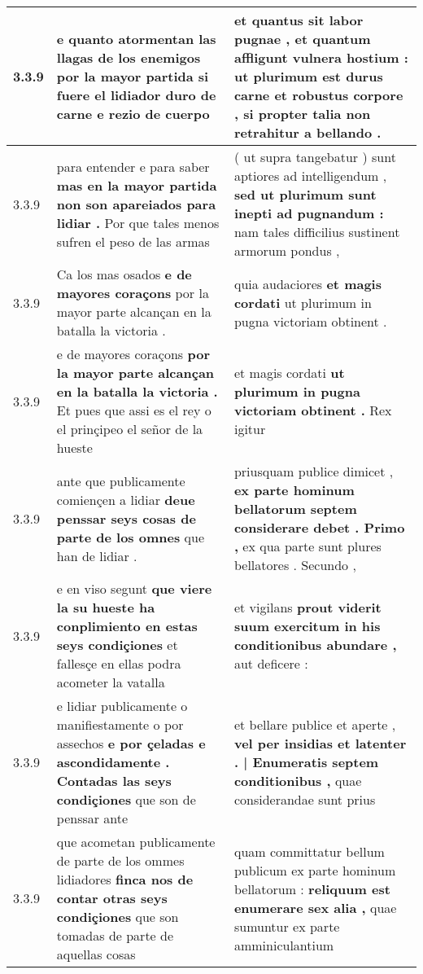\begin{tabular}{|p{1cm}|p{6.5cm}|p{6.5cm}|}
3.3.9 & e quanto atormentan las llagas de los enemigos \textbf{ por la mayor partida } si fuere el lidiador duro de carne e rezio de cuerpo & et quantus sit labor pugnae , et quantum affligunt vulnera hostium : \textbf{ ut plurimum est durus carne et robustus corpore , } si propter talia non retrahitur a bellando . \\\hline
3.3.9 & para entender e para saber \textbf{ mas en la mayor partida non son apareiados para lidiar . } Por que tales menos sufren el peso de las armas & ( ut supra tangebatur ) sunt aptiores ad intelligendum , \textbf{ sed ut plurimum sunt inepti ad pugnandum : } nam tales difficilius sustinent armorum pondus , \\\hline
3.3.9 & Ca los mas osados \textbf{ e de mayores coraçons } por la mayor parte alcançan en la batalla la victoria . & quia audaciores \textbf{ et magis cordati } ut plurimum in pugna victoriam obtinent . \\\hline
3.3.9 & e de mayores coraçons \textbf{ por la mayor parte alcançan en la batalla la victoria . } Et pues que assi es el rey o el prinçipeo el señor de la hueste & et magis cordati \textbf{ ut plurimum in pugna victoriam obtinent . } Rex igitur \\\hline
3.3.9 & ante que publicamente comiençen a lidiar \textbf{ deue penssar seys cosas de parte de los omnes } que han de lidiar . & priusquam publice dimicet , \textbf{ ex parte hominum bellatorum septem considerare debet . Primo , } ex qua parte sunt plures bellatores . Secundo , \\\hline
3.3.9 & e en viso segunt \textbf{ que viere la su hueste ha conplimiento en estas seys condiçiones } et fallesçe en ellas podra acometer la vatalla & et vigilans \textbf{ prout viderit suum exercitum in his conditionibus abundare , } aut deficere : \\\hline
3.3.9 & e lidiar publicamente o manifiestamente o por assechos \textbf{ e por çeladas e ascondidamente . Contadas las seys condiçiones } que son de penssar ante & et bellare publice et aperte , \textbf{ vel per insidias et latenter . | Enumeratis septem conditionibus , } quae considerandae sunt prius \\\hline
3.3.9 & que acometan publicamente de parte de los ommes lidiadores \textbf{ finca nos de contar otras seys condiçiones } que son tomadas de parte de aquellas cosas & quam committatur bellum publicum ex parte hominum bellatorum : \textbf{ reliquum est enumerare sex alia , } quae sumuntur ex parte amminiculantium \\\hline

\end{tabular}

